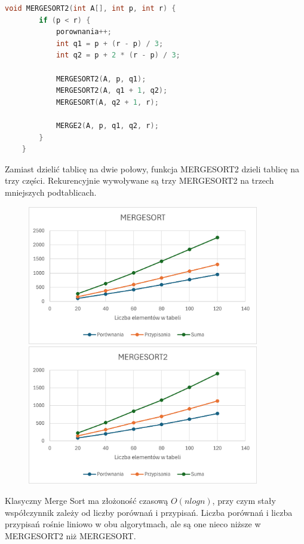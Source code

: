 \documentclass{article}
\begin{document}
	\begin{lstlisting}[language=C++, tabsize=3]
	void MERGESORT2(int A[], int p, int r) {
		if (p < r) {
			porownania++;
			int q1 = p + (r - p) / 3;
			int q2 = p + 2 * (r - p) / 3;
			
			MERGESORT2(A, p, q1);
			MERGESORT2(A, q1 + 1, q2);
			MERGESORT(A, q2 + 1, r);
			
			MERGE2(A, p, q1, q2, r);
		}
	}
	\end{lstlisting}
	Zamiast dzielić tablicę na dwie połowy, funkcja MERGESORT2 dzieli tablicę na trzy części. Rekurencyjnie wywoływane są trzy MERGESORT2 na trzech mniejszych podtablicach.
	
	\begin{figure}[H]
		\centering
		\includegraphics[width=0.9\textwidth]{MER1.png}
		\includegraphics[width=0.9\textwidth]{MER2.png}
	\end{figure}
	
	
	Klasyczny Merge Sort ma złożoność czasową \(O(nlogn)\), przy czym stały współczynnik zależy od liczby porównań i przypisań. Liczba porównań i liczba przypisań rośnie liniowo w obu algorytmach, ale są one nieco niższe w MERGESORT2 niż MERGESORT.
	
\end{document}
